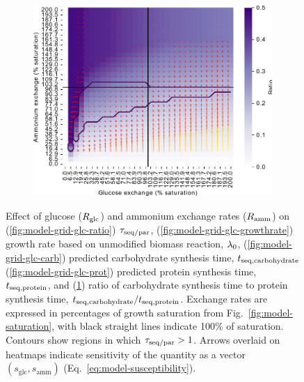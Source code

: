 \begin{figure}
  \begin{subfigure}[t]{0.45\textwidth}
  \centering
    \includegraphics[width=\linewidth]{ec_grid_glc_amm_carb_to_prot}
    \caption{
    }
    \label{fig:model-grid-glc-carb-to-prot}
  \end{subfigure}
  \caption{
    Effect of glucose ($R_{\mathrm{glc}}$) and ammonium exchange rates ($R_{\mathrm{amm}}$) on (\ref{fig:model-grid-glc-ratio}) $\tau_{\mathrm{seq}/\mathrm{par}}$, (\ref{fig:model-grid-glc-growthrate}) growth rate based on unmodified biomass reaction, $\lambda_{0}$, (\ref{fig:model-grid-glc-carb}) predicted carbohydrate synthesis time, $t_{\mathrm{seq},\mathrm{carbohydrate}}$ (\ref{fig:model-grid-glc-prot}) predicted protein synthesis time, $t_{\mathrm{seq},\mathrm{protein}}$, and (\ref{fig:model-grid-glc-carb-to-prot}) ratio of carbohydrate synthesis time to protein synthesis time, $t_{\mathrm{seq},\mathrm{carbohydrate}}/t_{\mathrm{seq},\mathrm{protein}}$.
    Exchange rates are expressed in percentages of growth saturation from Fig.\ \ref{fig:model-saturation}, with black straight lines indicate 100\% of saturation.
    Contours show regions in which $\tau_{\mathrm{seq}/\mathrm{par}} > 1$.
    Arrows overlaid on heatmaps indicate sensitivity of the quantity as a vector $(s_{\mathrm{glc}}, s_{\mathrm{amm}})$ (Eq.\ \ref{eq:model-susceptibility}).
  }
  \label{fig:model-grid-glc}
\end{figure}

